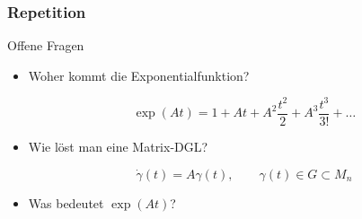\begin{frame}[t]
  \setlength{\abovedisplayskip}{5pt}
  \setlength{\belowdisplayskip}{5pt}
  \frametitle{Repetition}
  \vspace{-20pt}
  \begin{block}{Offene Fragen}
    \begin{itemize}[<+->]
      \item Woher kommt die Exponentialfunktion?
      \begin{fleqn} 
        \[
        \exp(At)
        =
        1 
        + At 
        + A^2\frac{t^2}{2}
        + A^3\frac{t^3}{3!} 
        + \ldots
        \]
      \end{fleqn}
      \item Wie löst man eine Matrix-DGL?
      \begin{fleqn} 
        \[ 
        \dot\gamma(t) = A\gamma(t),
        \qquad
        \gamma(t) \in G \subset M_n
        \]
      \end{fleqn}
      \item Was bedeutet $\exp(At)$?
    \end{itemize}
  \end{block}
\end{frame}

\egroup
